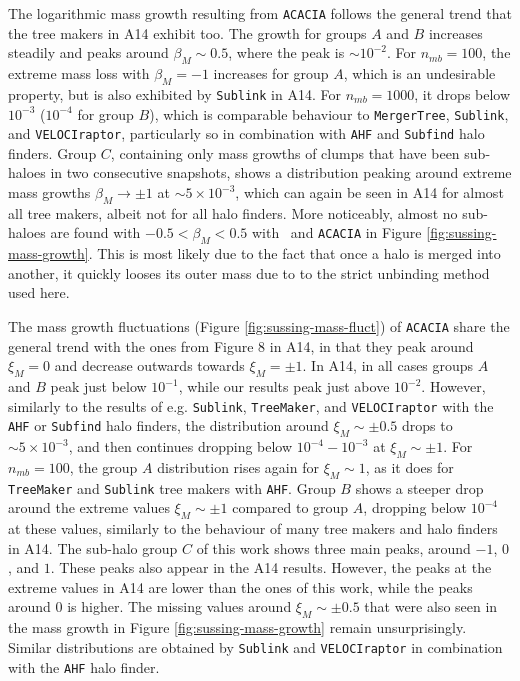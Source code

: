 The logarithmic mass growth resulting from \texttt{ACACIA} follows the general trend that the tree makers in A14 exhibit too.
The growth for groups $A$ and $B$ increases steadily and peaks around $\beta_M \sim 0.5$, where the peak is $\sim 10^{-2}$.
For $n_{mb} = 100$, the extreme mass loss with $\beta_M = -1$ increases for group $A$, which is an undesirable property, but is also exhibited by \texttt{Sublink} in A14.
For $n_{mb} = 1000$, it drops below $10^{-3}$ ($10^{-4}$ for group $B$), which is comparable behaviour to \texttt{MergerTree}, \texttt{Sublink}, and \texttt{VELOCIraptor}, particularly so in combination with \texttt{AHF} and \texttt{Subfind} halo finders.
Group $C$, containing only mass growths of clumps that have been sub-haloes in two consecutive snapshots, shows a distribution peaking around extreme mass growths $\beta_M \rightarrow \pm 1$ at $\sim 5 \times 10^{-3}$, which can again be seen in A14 for almost all tree makers, albeit not for all halo finders.
More noticeably, almost no sub-haloes are found with $-0.5 < \beta_M < 0.5$ with \phew\ and \texttt{ACACIA} in Figure \ref{fig:sussing-mass-growth}.
This is most likely due to the fact that once a halo is merged into another, it quickly looses its outer mass due to to the strict unbinding method used here.

The mass growth fluctuations (Figure \ref{fig:sussing-mass-fluct}) of \texttt{ACACIA} share the general trend with the ones from Figure 8 in A14, in that they peak around $\xi_M = 0$ and decrease outwards towards $\xi_M = \pm 1$.
In A14, in all cases groups $A$ and $B$ peak just below $10^{-1}$, while our results peak just above $10^{-2}$.
However, similarly to the results of e.g. \texttt{Sublink}, \texttt{TreeMaker}, and \texttt{VELOCIraptor} with the \texttt{AHF} or \texttt{Subfind} halo finders, the distribution around $\xi_M \sim \pm 0.5$ drops to $\sim 5 \times 10^{-3}$, and then continues dropping below $10^{-4} - 10^{-3}$ at $\xi_M \sim \pm 1$.
For $n_{mb} = 100$, the group $A$ distribution rises again for $\xi_M \sim 1$, as it does for \texttt{TreeMaker} and \texttt{Sublink} tree makers with \texttt{AHF}.
Group $B$ shows a steeper drop around the extreme values $\xi_M \sim \pm 1$ compared to group $A$, dropping below $10^{-4}$ at these values, similarly to the behaviour of many tree makers and halo finders in A14.
The sub-halo group $C$ of this work shows three main peaks, around $-1$, $0$, and $1$.
These peaks also appear in the A14 results.
However, the peaks at the extreme values in A14 are lower than the ones of this work, while the peaks around $0$ is higher.
The missing values around $\xi_M \sim \pm 0.5$ that were also seen in the mass growth in Figure \ref{fig:sussing-mass-growth} remain unsurprisingly.
Similar distributions are obtained by \texttt{Sublink} and \texttt{VELOCIraptor} in combination with the \texttt{AHF} halo finder.




